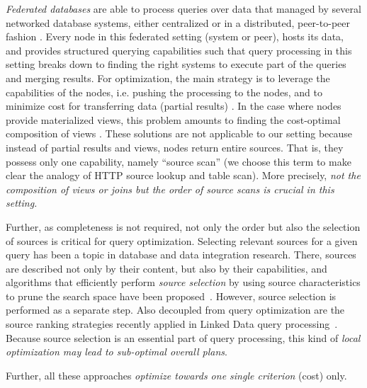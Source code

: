 \emph{Federated databases} are able to process queries over data that
managed by several networked database systems, either centralized
\cite{zsu_principles_2011} or in a distributed, peer-to-peer fashion
\cite{huebsch_architecture_2005}. Every node in this federated setting
(system or peer), hosts its data, and provides structured querying
capabilities such that query processing in this setting breaks down to
finding the right systems to execute part of the queries and merging
results. For optimization, the main strategy is to leverage the
capabilities of the nodes, i.e. pushing the processing to the nodes,
and to minimize cost for transferring data (partial results)
\cite{kossmann_iterative_2000,zsu_principles_2011}. In the case where
nodes provide materialized views, this problem amounts to finding the
cost-optimal composition of views
\cite{pottinger_minicon:_2001}. These solutions are not applicable to
our setting because instead of partial results and views, nodes return
entire sources. That is, they possess only one capability, namely
``source scan'' (we choose this term to make clear the analogy of HTTP
source lookup and table scan). More precisely, \emph{not the
  composition of views or joins but the order of source scans is
  crucial in this setting.} 

Further, as completeness is not required, not only the order but also
the selection of sources is critical for query optimization. Selecting
relevant sources for a given query has been a topic in database and
data integration research. There, sources are described not only by
their content, but also by their capabilities, and algorithms that
efficiently perform \emph{source selection} by using source
characteristics to prune the search space have been
proposed~\cite{levy_querying_1996}. However, source selection is
performed as a separate step. Also decoupled from query optimization
are the source ranking strategies recently applied in Linked Data
query processing~\cite{harth_data_2010,ladwig_linked_2010}. Because
source selection is an essential part of query processing, this kind
of \emph{local optimization may lead to sub-optimal overall plans}.


Further, all these approaches \emph{optimize towards one single
  criterion} (cost) only.


